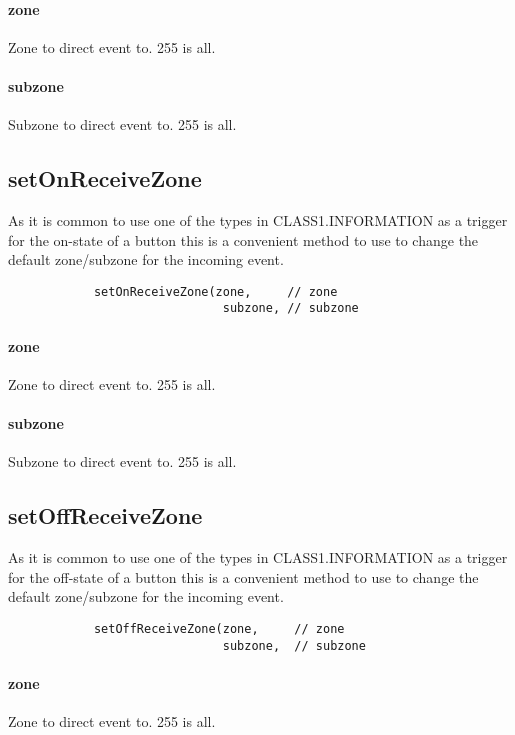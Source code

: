 \documentclass{article}
\begin{document}
        \paragraph*{zone}
        Zone to direct event to. 255 is all.
        \paragraph*{subzone}
        Subzone to direct event to. 255 is all.
        
        
        
        \subsection*{setOnReceiveZone}
        As it is common to use one of the types in CLASS1.INFORMATION as a trigger
        for the on-state of 
        a button this is a convenient method to use to change the default
        zone/subzone for the incoming event.
        \begin{verbatim}
            setOnReceiveZone(zone,     // zone
                              subzone, // subzone
        \end{verbatim}
        \paragraph*{zone}
        Zone to direct event to. 255 is all.
        \paragraph*{subzone}
        Subzone to direct event to. 255 is all.
        
        
        \subsection*{setOffReceiveZone}
        As it is common to use one of the types in CLASS1.INFORMATION as a trigger
        for the off-state
        of a button this is a convenient method to use to change the default
        zone/subzone for the incoming event.
        \begin{verbatim}
            setOffReceiveZone(zone,     // zone
                              subzone,  // subzone
        \end{verbatim}
        \paragraph*{zone}
        Zone to direct event to. 255 is all.
\end{document}
